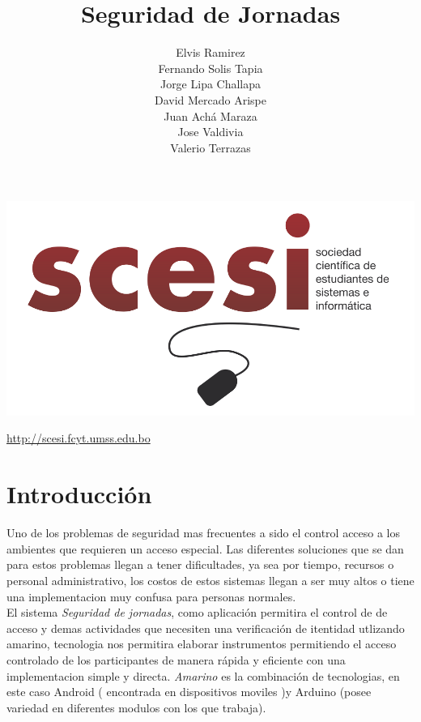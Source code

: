 \documentclass[letter,12pt]{article}
\title{Seguridad de Jornadas}
\author{
	Elvis Ramirez 			\\ 
	Fernando Solis Tapia	\\ 
	Jorge Lipa Challapa		\\ 
	David Mercado Arispe	\\ 
	Juan Ach\'a Maraza		\\ 
	Jose Valdivia			\\ 
	Valerio Terrazas
}
\begin{document}
\maketitle
\begin{center}
    \includegraphics[width=1.0\textwidth]{logo.png} 
\end{center}
\begin{center}
    \url {http://scesi.fcyt.umss.edu.bo}
\end{center}
\pagebreak
\tableofcontents
\pagebreak

\section{Introducci\'on}

Uno de los problemas de seguridad mas frecuentes a sido el control acceso a los ambientes que requieren un acceso especial. Las diferentes soluciones que se dan para estos problemas llegan a tener dificultades, ya sea por tiempo, recursos o personal administrativo, los costos de estos sistemas llegan a ser muy altos o tiene una implementacion muy confusa para personas normales. \\

El sistema \textit{Seguridad de jornadas}, como aplicaci\'on permitira el control de de acceso y demas actividades que necesiten una verificaci\'on de itentidad utlizando amarino, tecnologia nos permitira elaborar instrumentos permitiendo el acceso controlado de los participantes de manera r\'apida y eficiente con una implementacion simple y directa. \textit{Amarino} es la combinaci\'on de tecnologias, en este caso Android ( encontrada en dispositivos moviles )y Arduino (posee variedad en diferentes modulos con los que trabaja).
\end{document}

